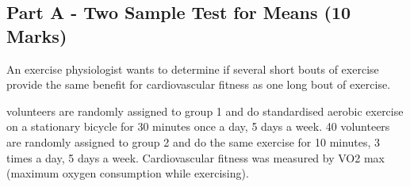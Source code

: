 \documentclass[a4paper,12pt]{article}
\begin{document}
%
%	
%
%
%		
%
%	
%	





\subsection*{Part A - Two Sample Test for Means (10 Marks)}
An exercise physiologist wants to determine if several short bouts of exercise provide the same benefit for cardiovascular fitness as one long bout of exercise. \\ \smallskip

 volunteers are randomly assigned to group 1 and do standardised aerobic exercise on a stationary bicycle for 30 minutes once a day, 5 days a week. 40 volunteers are randomly assigned to group 2 and do the same exercise for 10 minutes, 3 times a day, 5 days a week. Cardiovascular fitness was measured by VO2 max (maximum oxygen consumption while exercising). 
\end{document}
